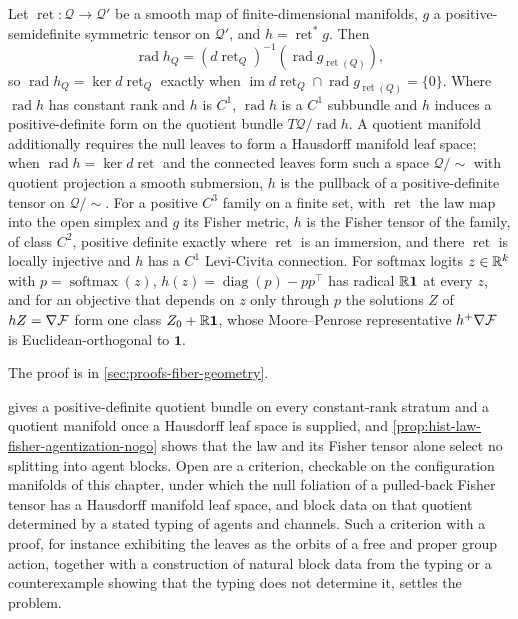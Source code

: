 Let $\operatorname{ret}:\mathcal Q\to\mathcal Q'$ be a smooth map of finite-dimensional
manifolds, $g$ a positive-semidefinite symmetric tensor on $\mathcal Q'$, and
$h=\operatorname{ret}^*g$.  Then
\begin{equation}
\operatorname{rad}h_Q
=(d\operatorname{ret}_Q)^{-1}\left(\operatorname{rad}g_{\operatorname{ret}(Q)}\right),
\label{eq:hist-cds-fisher-radical}
\end{equation}
so $\operatorname{rad}h_Q=\ker d\operatorname{ret}_Q$ exactly when
$\operatorname{im}d\operatorname{ret}_Q\cap\operatorname{rad}g_{\operatorname{ret}(Q)}
=\{0\}$.  Where $\operatorname{rad}h$ has constant rank and $h$ is $C^1$,
$\operatorname{rad}h$ is a $C^1$ subbundle and $h$ induces a positive-definite form on
the quotient bundle $T\mathcal Q/\operatorname{rad}h$.  A quotient manifold additionally
requires the null leaves to form a Hausdorff manifold leaf space; when
$\operatorname{rad}h=\ker d\operatorname{ret}$ and the connected leaves form such a space
$\mathcal Q/{\sim}$ with quotient projection a smooth submersion, $h$ is the pullback of a positive-definite tensor on
$\mathcal Q/{\sim}$.  For a positive $C^3$ family on a finite set, with
$\operatorname{ret}$ the law map into the open simplex and $g$ its Fisher metric, $h$ is
the Fisher tensor of the family, of class $C^2$, positive definite exactly where
$\operatorname{ret}$ is an immersion, and there $\operatorname{ret}$ is locally
injective and $h$ has a $C^1$ Levi-Civita connection.  For softmax logits $z\in\mathbb R^k$
with $p=\operatorname{softmax}(z)$, $h(z)=\operatorname{diag}(p)-pp^\top$ has radical
$\mathbb R\mathbf 1$ at every $z$, and for an objective that depends on $z$ only through $p$
the solutions $Z$ of $hZ=\nabla\mathcal F$ form one class $Z_0+\mathbb R\mathbf 1$, whose
Moore--Penrose representative $h^+\nabla\mathcal F$ is Euclidean-orthogonal to
$\mathbf 1$.  

The proof is in \cref{sec:proofs-fiber-geometry}.

 gives a positive-definite quotient bundle on
every constant-rank stratum and a quotient manifold once a Hausdorff leaf space is
supplied, and \cref{prop:hist-law-fisher-agentization-nogo} shows that the law and its
Fisher tensor alone select no splitting into agent blocks.  Open are a criterion,
checkable on the configuration manifolds of this chapter, under which the null foliation
of a pulled-back Fisher tensor has a Hausdorff manifold leaf space, and block data on
that quotient determined by a stated typing of agents and channels.  Such a criterion
with a proof, for instance exhibiting the leaves as the orbits of a free and proper group
action, together with a construction of natural block data from the typing or a
counterexample showing that the typing does not determine it, settles the problem.

